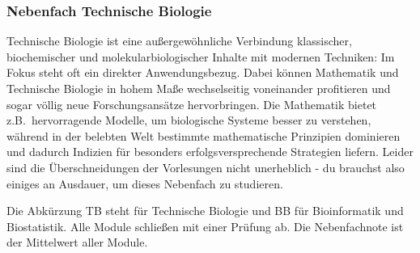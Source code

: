 \subsubsection{Nebenfach Technische Biologie}
Technische Biologie ist eine außergewöhnliche Verbindung klassischer,
biochemischer und molekularbiologischer Inhalte mit modernen Techniken:
Im Fokus steht oft ein direkter Anwendungsbezug.
Dabei können Mathematik und Technische Biologie
in hohem Maße wechselseitig voneinander profitieren
und sogar völlig neue Forschungsansätze hervorbringen.
Die Mathematik bietet z.B.\ hervorragende Modelle,
um biologische Systeme besser zu verstehen,
während in der belebten Welt bestimmte mathematische Prinzipien
dominieren und dadurch Indizien für besonders
erfolgsversprechende Strategien liefern. 
Leider sind die Überschneidungen der Vorlesungen
nicht unerheblich - du brauchst also einiges an Ausdauer,
um dieses Nebenfach zu studieren.

%
%
%
%
%
%

\begin{center}
\end{center}
Die Abkürzung TB steht für \glqq Technische Biologie\grqq
und BB für \glqq Bioinformatik und Biostatistik\grqq.
Alle Module schließen mit einer Prüfung ab.
Die Nebenfachnote ist der Mittelwert aller Module.

